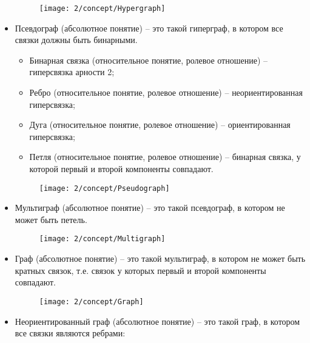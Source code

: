 \begin{itemize}
  \begin{figure}[h!]
    \centering
    \texttt{[image: 2/concept/Hypergraph]}
    \label{fig:Concept_Hypergraph}
  \end{figure}

\newpage

\item Псевдограф (абсолютное понятие) – это такой гиперграф, в котором
  все связки должны быть бинарными.
  \begin{itemize}
  \item Бинарная связка (относительное понятие, ролевое отношение)
    – гиперсвязка арности 2; 
  \item Ребро (относительное понятие, ролевое
    отношение) – неориентированная гиперсвязка;
  \item Дуга (относительное понятие, ролевое отношение) –
    ориентированная гиперсвязка;
  \item Петля (относительное понятие, ролевое отношение) – бинарная
    связка, у которой первый и второй компоненты совпадают.
  \end{itemize}

  \begin{figure}[h!]
    \centering
    \texttt{[image: 2/concept/Pseudograph]}
    \label{fig:Concept_Pseudograph}
  \end{figure}

\newpage

\item Мультиграф (абсолютное понятие) – это такой псевдограф, в
  котором не может быть петель.

  \begin{figure}[h!]
    \centering
    \texttt{[image: 2/concept/Multigraph]}
    \label{fig:Concept_Multigraph}
  \end{figure}

\newpage
 
\item Граф (абсолютное понятие) – это такой мультиграф, в котором не
  может быть кратных связок, т.е. связок у которых первый и второй
  компоненты совпадают.

  \begin{figure}[h!]
    \centering
    \texttt{[image: 2/concept/Graph]}
    \label{fig:Concept_Graph}
  \end{figure}

\newpage
 
\item Неориентированный граф (абсолютное понятие) – это такой граф, в
  котором все связки являются ребрами:


\end{itemize}
